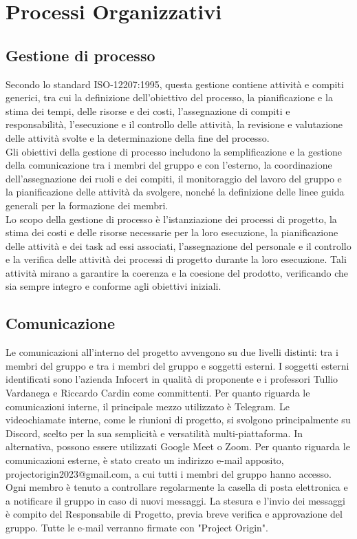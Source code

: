 \section{Processi Organizzativi}

\subsection{Gestione di processo}
Secondo lo standard ISO-12207:1995, questa gestione contiene attività e compiti generici, tra cui la definizione dell'obiettivo del processo, la pianificazione e la stima 
dei tempi, delle risorse e dei costi, l'assegnazione di compiti e responsabilità, l'esecuzione e il controllo delle attività, la revisione e valutazione delle attività svolte 
e la determinazione della fine del processo. \\
Gli obiettivi della gestione di processo includono la semplificazione e la gestione della comunicazione tra i membri del gruppo e con l'esterno, la coordinazione 
dell'assegnazione dei ruoli e dei compiti, il monitoraggio del lavoro del gruppo e la pianificazione delle attività da svolgere, nonché la definizione delle linee guida 
generali per la formazione dei membri. \\
Lo scopo della gestione di processo è l'istanziazione dei processi di progetto, la stima dei costi e delle risorse necessarie per la loro esecuzione, la pianificazione 
delle attività e dei task ad essi associati, l'assegnazione del personale e il controllo e la verifica delle attività dei processi di progetto durante la loro esecuzione. 
Tali attività mirano a garantire la coerenza e la coesione del prodotto, verificando che sia sempre integro e conforme agli obiettivi iniziali.

\subsection{Comunicazione}
Le comunicazioni all'interno del progetto avvengono su due livelli distinti: tra i membri del gruppo e tra i membri del gruppo e soggetti esterni. I soggetti esterni 
identificati sono l'azienda Infocert in qualità di proponente e i professori Tullio Vardanega e Riccardo Cardin come committenti. Per quanto riguarda le comunicazioni interne, 
il principale mezzo utilizzato è Telegram. Le videochiamate interne, come le riunioni di progetto, si svolgono principalmente su Discord, scelto per la sua semplicità e 
versatilità multi-piattaforma. In alternativa, possono essere utilizzati Google Meet o Zoom. Per quanto riguarda le comunicazioni esterne, è stato creato un indirizzo e-mail 
apposito, projectorigin2023@gmail.com, a cui tutti i membri del gruppo hanno accesso. Ogni membro è tenuto a controllare regolarmente la casella di posta elettronica e a 
notificare il gruppo in caso di nuovi messaggi. La stesura e l'invio dei messaggi è compito del Responsabile di Progetto, previa breve verifica e approvazione del gruppo. 
Tutte le e-mail verranno firmate con "Project Origin". 

